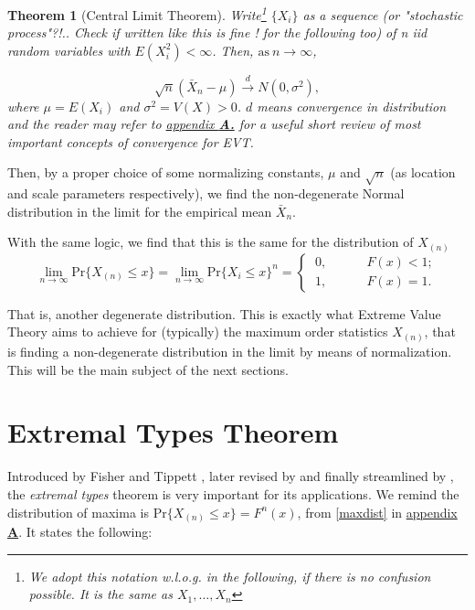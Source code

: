 \documentclass[11pt,a4paper,openany ]{book}
\newtheorem{exe}{Theorem}
\begin{document}
\begin{exe}[Central Limit Theorem] 
	Write\footnote{We adopt this notation w.l.o.g. in the following, if there is no confusion possible. It is the same as $X_1,\dots,X_n$} $\{X_i\}$ as a sequence \emph{(or "stochastic process"?!.. Check if written like this is fine ! for the following too)}  of n iid random variables with $E(X^2_i)<\infty$. Then, $\text{as} \ n\rightarrow\infty$,
	
	\begin{equation*}
	\sqrt{n}(\bar{X}_n-\mu)\stackrel{d}{\longrightarrow}N(0,\sigma^2),
	\end{equation*}
	where $\mu=E(X_i)$ and $\sigma^2=V(X)>0$. $d$ means convergence in distribution and the reader may refer to \hyperref[convconc]{\emph{appendix\textbf{ A.}}} for a useful short review of most important concepts of convergence for EVT.
\end{exe}
Then, by a proper choice of some normalizing constants, $\mu$ and $\sqrt{n}$ (as location and scale parameters respectively), we find the non-degenerate Normal distribution in the limit for the empirical mean $\bar{X}_n$. 

With the same logic, we find that this is the same for the distribution of $X_{(n)}$ 
\begin{equation}
\displaystyle{\lim_{n \to \infty}}\text{Pr}\big\{X_{(n)}\leq x\big\}=\displaystyle{\lim_{n \to \infty}}\text{Pr}\big\{X_i\leq x\big\}^n=\begin{cases}
\ 0, \ \ \ \ \ \ \ \ \ \ \  \ \ \ F(x)<1; \\ 
\ 1, \ \ \ \ \ \ \ \ \ \ \ \  \ \ F(x)=1.
\end{cases}
\end{equation}

That is, another degenerate distribution.
This is exactly what Extreme Value Theory aims to achieve for (typically) the maximum order statistics $X_{(n)}$, that is finding a non-degenerate distribution in the limit by means of normalization. This will be the main subject of the next sections.


\section{Extremal Types Theorem}




Introduced by Fisher and Tippett \cite{fisher_limiting_1928}, later revised by \cite{gnedenko_sur_1943} and finally streamlined by \cite{De_on_1970}, the \emph{extremal types} theorem is very important for its applications. We remind the distribution of maxima is $\text{Pr}\big\{X_{(n)}\leq x\big\}=F^n(x)$, from \ref{maxdist} in \hyperref[appA]{appendix \textbf{A}}. It states the following:
\end{document}

